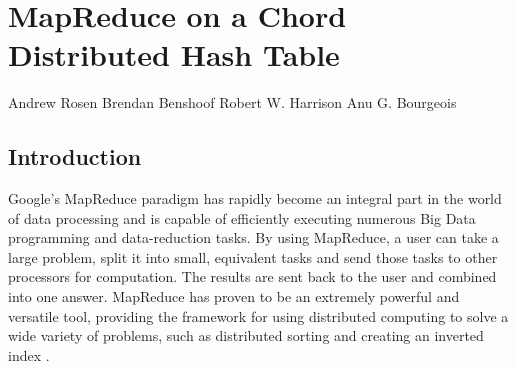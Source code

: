 
\chapter{MapReduce on a Chord Distributed Hash Table}

\begin{center}
Andrew Rosen \qquad Brendan Benshoof  \qquad Robert W. Harrison \qquad Anu G. Bourgeois
\end{center}


\section{Introduction}




Google's MapReduce \cite{mapreduce} paradigm has rapidly become an integral part in the world of data processing and is capable of efficiently executing numerous Big Data programming and data-reduction tasks.  By using MapReduce, a user can take a large problem, split it into small, equivalent tasks and send those tasks to other processors for computation.  The results are sent back to the user and combined into one answer.  MapReduce has proven to be an extremely powerful and versatile tool, providing the framework for using distributed computing to solve a wide variety of problems, such as distributed sorting and creating an inverted index \cite{mapreduce}. 



